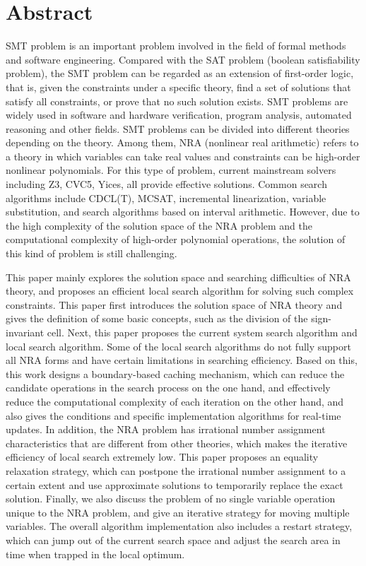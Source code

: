 \intobmk\chapter*{Abstract}%

SMT problem is an important problem involved in the field of formal methods and software engineering. Compared with the SAT problem (boolean satisfiability problem), the SMT problem can be regarded as an extension of first-order logic, that is, given the constraints under a specific theory, find a set of solutions that satisfy all constraints, or prove that no such solution exists. SMT problems are widely used in software and hardware verification, program analysis, automated reasoning and other fields. SMT problems can be divided into different theories depending on the theory. Among them, NRA (nonlinear real arithmetic) refers to a theory in which variables can take real values ​​and constraints can be high-order nonlinear polynomials. For this type of problem, current mainstream solvers including Z3, CVC5, Yices, all provide effective solutions. Common search algorithms include CDCL(T), MCSAT, incremental linearization, variable substitution, and search algorithms based on interval arithmetic. However, due to the high complexity of the solution space of the NRA problem and the computational complexity of high-order polynomial operations, the solution of this kind of problem is still challenging.

This paper mainly explores the solution space and searching difficulties of NRA theory, and proposes an efficient local search algorithm for solving such complex constraints. This paper first introduces the solution space of NRA theory and gives the definition of some basic concepts, such as the division of the sign-invariant cell. Next, this paper proposes the current system search algorithm and local search algorithm. Some of the local search algorithms do not fully support all NRA forms and have certain limitations in searching efficiency. Based on this, this work designs a boundary-based caching mechanism, which can reduce the candidate operations in the search process on the one hand, and effectively reduce the computational complexity of each iteration on the other hand, and also gives the conditions and specific implementation algorithms for real-time updates. In addition, the NRA problem has irrational number assignment characteristics that are different from other theories, which makes the iterative efficiency of local search extremely low. This paper proposes an equality relaxation strategy, which can postpone the irrational number assignment to a certain extent and use approximate solutions to temporarily replace the exact solution. Finally, we also discuss the problem of no single variable operation unique to the NRA problem, and give an iterative strategy for moving multiple variables. The overall algorithm implementation also includes a restart strategy, which can jump out of the current search space and adjust the search area in time when trapped in the local optimum.

